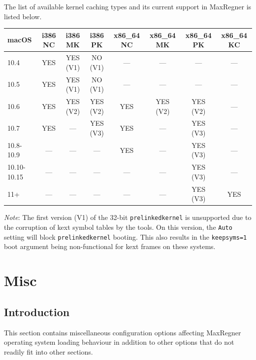\documentclass[]{article}
\makeatletter
\renewcommand{\label}[1]{%
\zref@wrapper@immediate{\oldlabel{#1}}}  %
\makeatother
\begin{document}
\begin{enumerate}
  The list of available kernel caching types and its current support in MaxRegner is listed below.

  \begin{center}
  \begin{tabular}{|p{0.67in}|c|c|c|c|c|c|c|}
  \hline
  \textbf{macOS} & \textbf{i386 NC} & \textbf{i386 MK} & \textbf{i386 PK} & \textbf{x86\_64 NC} & \textbf{x86\_64 MK} & \textbf{x86\_64 PK} & \textbf{x86\_64 KC} \\
  \hline
  10.4 & YES & YES (V1) & NO (V1) & --- & --- & --- & --- \\
  \hline
  10.5 & YES & YES (V1) & NO (V1) & --- & --- & --- & --- \\
  \hline
  10.6 & YES & YES (V2) & YES (V2) & YES & YES (V2) & YES (V2) & --- \\
  \hline
  10.7 & YES & --- & YES (V3) & YES & --- & YES (V3) & --- \\
  \hline
  10.8-10.9 & --- & --- & --- & YES & --- & YES (V3) & --- \\
  \hline
  10.10-10.15 & --- & --- & --- & --- & --- & YES (V3) & --- \\
  \hline
  11+ & --- & --- & --- & --- & --- & YES (V3) & YES \\
  \hline
  \end{tabular}
  \end{center}

  \emph{Note}: The first version (V1) of the 32-bit \texttt{prelinkedkernel} is unsupported due to
  the corruption of kext symbol tables by the tools. On this version, the \texttt{Auto} setting will
  block \texttt{prelinkedkernel} booting. This also results in the \texttt{keepsyms=1} boot argument
  being non-functional for kext frames on these systems.

\end{enumerate}


\section{Misc}\label{misc}

\subsection{Introduction}\label{miscintro}

This section contains miscellaneous configuration options affecting MaxRegner operating system
loading behaviour in addition to other options that do not readily fit into other sections.
\end{document}
